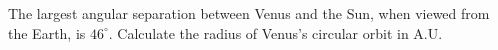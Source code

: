 The largest angular separation between Venus and the Sun, when viewed from the
Earth, is $46^\circ$. Calculate the radius of Venus's circular orbit in A.U.
